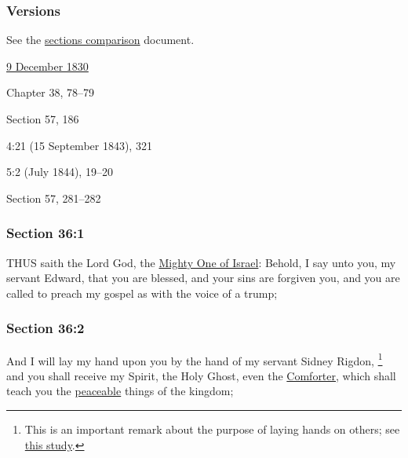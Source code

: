 	\subsubsection{Versions}
		\label{DC36-V}
		
		See the \href{https://drive.google.com/file/d/1goAvNz8jS4R8slYfMG_db55Ty2z_vmgK/view?usp=sharing}{sections comparison} document.
	
		\begin{compactdesc}
			\item[JSP] \hyperref[EMS-1830-JS-9-DEC-1830]{9 December 1830}
			\item[BC] Chapter 38, 78--79
			\item[DC 1835] Section 57, 186
			\item[TS] 4:21 (15 September 1843), 321
			\item[MS] 5:2 (July 1844), 19--20
			\item[DC 1844] Section 57, 281--282
		\end{compactdesc}

	\subsubsection{Section 36:1} %
		\label{DC36-1}

		THUS saith the Lord God, the \hyperref[CHRIST-titles]{Mighty One of Israel}: Behold, I say unto you, my servant Edward, that you are blessed, and your sins are forgiven you, and you are called to preach my gospel as with the voice of a trump;


	\subsubsection{Section 36:2} %
		\label{DC36-2}

		And I will lay my hand upon you by the hand of my servant Sidney Rigdon,%
			\footnote{%
				This is an important remark about the purpose of laying hands on others; see \hyperref[HAND-laying]{this study}.
				}
		and you shall receive my Spirit, the Holy Ghost, even the \hyperref[COMFORTER]{Comforter}, which shall teach you the \hyperref[PEACEABLE]{peaceable} things of the kingdom;

